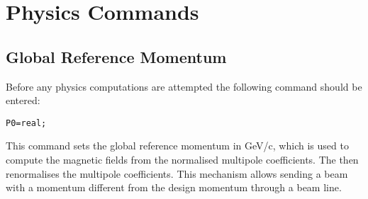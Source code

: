 \chapter{Physics Commands}
\label{sec:physics}
 
\section{Global Reference Momentum}
\label{sec:P0}
Before any physics computations are attempted the following command
should be entered:
\begin{verbatim}
P0=real;
\end{verbatim}
This command sets the global reference momentum in GeV/c,
which is used to compute the magnetic fields from the normalised
multipole coefficients.
The  then renormalises the
multipole coefficients.
This mechanism allows sending a beam with a momentum different from the
design momentum through a beam line.

